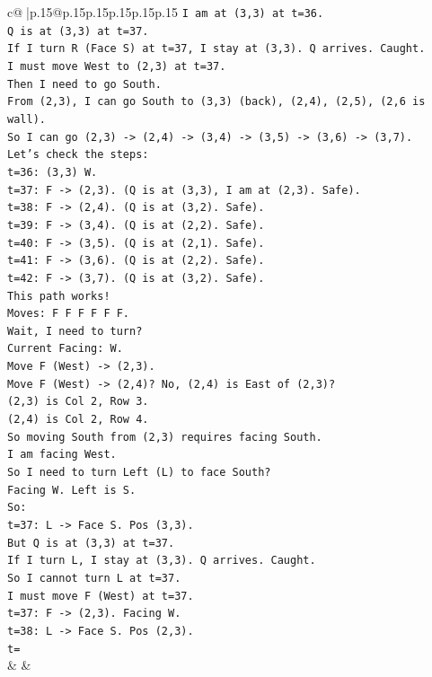 \documentclass{article}
\begin{document}
{\begin{supertabular}{c@{$\;$}|p{.15\linewidth}@{}p{.15\linewidth}p{.15\linewidth}p{.15\linewidth}p{.15\linewidth}p{.15\linewidth}}
{{{\texttt{I am at (3,3) at t=36.} \\
\texttt{Q is at (3,3) at t=37.} \\
\texttt{If I turn R (Face S) at t=37, I stay at (3,3). Q arrives. Caught.} \\
\texttt{I must move West to (2,3) at t=37.} \\
\texttt{Then I need to go South.} \\
\texttt{From (2,3), I can go South to (3,3) (back), (2,4), (2,5), (2,6 is wall).} \\
\texttt{So I can go (2,3) {-}> (2,4) {-}> (3,4) {-}> (3,5) {-}> (3,6) {-}> (3,7).} \\
\texttt{Let's check the steps:} \\
\texttt{t=36: (3,3) W.} \\
\texttt{t=37: F {-}> (2,3). (Q is at (3,3), I am at (2,3). Safe).} \\
\texttt{t=38: F {-}> (2,4). (Q is at (3,2). Safe).} \\
\texttt{t=39: F {-}> (3,4). (Q is at (2,2). Safe).} \\
\texttt{t=40: F {-}> (3,5). (Q is at (2,1). Safe).} \\
\texttt{t=41: F {-}> (3,6). (Q is at (2,2). Safe).} \\
\texttt{t=42: F {-}> (3,7). (Q is at (3,2). Safe).} \\
\texttt{This path works!} \\
\texttt{Moves: F F F F F F.} \\
\texttt{Wait, I need to turn?} \\
\texttt{Current Facing: W.} \\
\texttt{Move F (West) {-}> (2,3).} \\
\texttt{Move F (West) {-}> (2,4)? No, (2,4) is East of (2,3)?} \\
\texttt{(2,3) is Col 2, Row 3.} \\
\texttt{(2,4) is Col 2, Row 4.} \\
\texttt{So moving South from (2,3) requires facing South.} \\
\texttt{I am facing West.} \\
\texttt{So I need to turn Left (L) to face South?} \\
\texttt{Facing W. Left is S.} \\
\texttt{So:} \\
\texttt{t=37: L {-}> Face S. Pos (3,3).} \\
\texttt{But Q is at (3,3) at t=37.} \\
\texttt{If I turn L, I stay at (3,3). Q arrives. Caught.} \\
\texttt{So I cannot turn L at t=37.} \\
\texttt{I must move F (West) at t=37.} \\
\texttt{t=37: F {-}> (2,3). Facing W.} \\
\texttt{t=38: L {-}> Face S. Pos (2,3).} \\
\texttt{t=} \\
            }
        }
    }
    & & \\ \\


\end{supertabular}}
\end{document}
